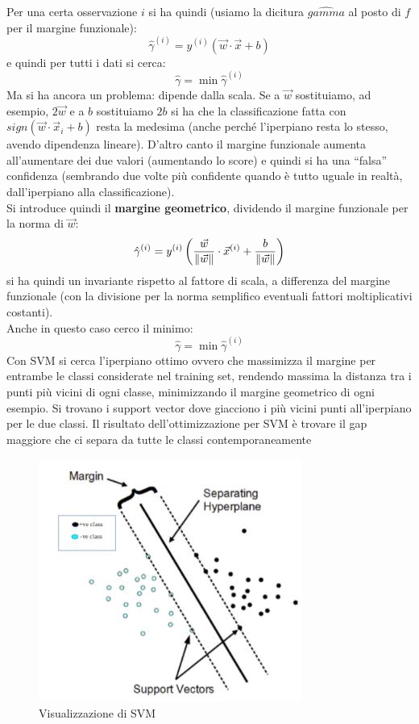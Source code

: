 Per una certa osservazione $i$ si ha quindi (usiamo la dicitura $\hat{gamma}$ al
posto di $f$ per il margine funzionale):
\[\hat{\gamma}^{(i)}=y^{(i)}(\vec{w}\cdot\vec{x}+b)\]
e quindi per tutti i dati si cerca:
\[\hat{\gamma}=\min \hat{\gamma}^{(i)}\]
Ma si ha ancora un problema: dipende dalla scala. Se a $\vec{w}$ sostituiamo,
ad esempio, $2\vec{w}$ e a $b$ sostituiamo $2b$ si ha che la classificazione
fatta con $sign(\vec{w}\cdot\vec{x}_i+b)$ resta la medesima (anche perché
l'iperpiano resta lo stesso, avendo dipendenza lineare). D'altro canto il
margine funzionale aumenta all'aumentare dei due valori (aumentando lo score) e
quindi si ha una ``falsa'' confidenza (sembrando due volte più confidente quando
è tutto uguale in realtà, dall'iperpiano alla classificazione).\\
Si introduce quindi il \textbf{margine geometrico}, dividendo il margine
funzionale per la norma di $\vec{w}$:
\[\hat{\gamma}^{(i)}=y^{(i)}\left(\frac{\vec{w}}{\norm{\vec{w}}}
    \cdot\vec{x}^{(i)}+\frac{b}{\norm{\vec{w}}}\right)\]
si ha quindi un invariante rispetto al fattore di scala, a differenza del margine
funzionale (con la divisione per la norma semplifico eventuali fattori
moltiplicativi costanti).\\
Anche in questo caso cerco il minimo:
\[\hat{\gamma}=\min \hat{\gamma}^{(i)}\]
Con SVM si cerca l'iperpiano ottimo ovvero che massimizza il margine per
entrambe le classi considerate nel training set, rendendo massima la distanza
tra i punti più vicini di ogni classe, minimizzando il margine geometrico di
ogni esempio. Si trovano i support vector dove giacciono i più vicini punti
all'iperpiano per le due classi. Il risultato dell'ottimizzazione per SVM è
trovare il gap maggiore che ci separa da tutte le classi contemporaneamente
\begin{figure}[H]
  \centering
  \includegraphics[scale = 0.7]{img/svm.jpg}
  \caption{Visualizzazione di SVM}
  \label{fig:svm}
\end{figure}
